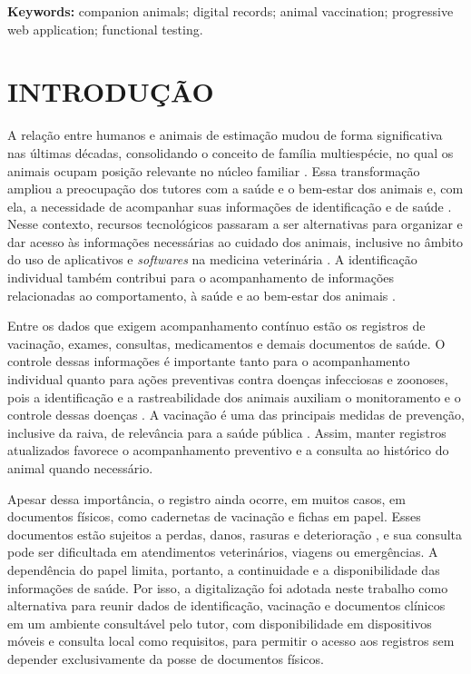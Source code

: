 \documentclass{UNESC}
\begin{document}
\vspace{0.5em}
\noindent
\textbf{Keywords:} companion animals; digital records; animal vaccination; progressive web application; functional testing.

\section{INTRODUÇÃO}

A relação entre humanos e animais de estimação mudou de forma significativa nas últimas décadas, consolidando o conceito de família multiespécie, no qual os animais ocupam posição relevante no núcleo familiar \cite{BOLSON2022}. Essa transformação ampliou a preocupação dos tutores com a saúde e o bem-estar dos animais e, com ela, a necessidade de acompanhar suas informações de identificação e de saúde \cite{MORAES2024}. Nesse contexto, recursos tecnológicos passaram a ser alternativas para organizar e dar acesso às informações necessárias ao cuidado dos animais, inclusive no âmbito do uso de aplicativos e \textit{softwares} na medicina veterinária \cite{MORAES2024}. A identificação individual também contribui para o acompanhamento de informações relacionadas ao comportamento, à saúde e ao bem-estar dos animais \cite{vidal2021}.

Entre os dados que exigem acompanhamento contínuo estão os registros de vacinação, exames, consultas, medicamentos e demais documentos de saúde. O controle dessas informações é importante tanto para o acompanhamento individual quanto para ações preventivas contra doenças infecciosas e zoonoses, pois a identificação e a rastreabilidade dos animais auxiliam o monitoramento e o controle dessas doenças \cite{murphy2008}. A vacinação é uma das principais medidas de prevenção, inclusive da raiva, de relevância para a saúde pública \cite{MOUTINHO2017}. Assim, manter registros atualizados favorece o acompanhamento preventivo e a consulta ao histórico do animal quando necessário.

Apesar dessa importância, o registro ainda ocorre, em muitos casos, em documentos físicos, como cadernetas de vacinação e fichas em papel. Esses documentos estão sujeitos a perdas, danos, rasuras e deterioração \cite{BOLSON2022}, e sua consulta pode ser dificultada em atendimentos veterinários, viagens ou emergências. A dependência do papel limita, portanto, a continuidade e a disponibilidade das informações de saúde. Por isso, a digitalização foi adotada neste trabalho como alternativa para reunir dados de identificação, vacinação e documentos clínicos em um ambiente consultável pelo tutor, com disponibilidade em dispositivos móveis e consulta local como requisitos, para permitir o acesso aos registros sem depender exclusivamente da posse de documentos físicos.
\end{document}
